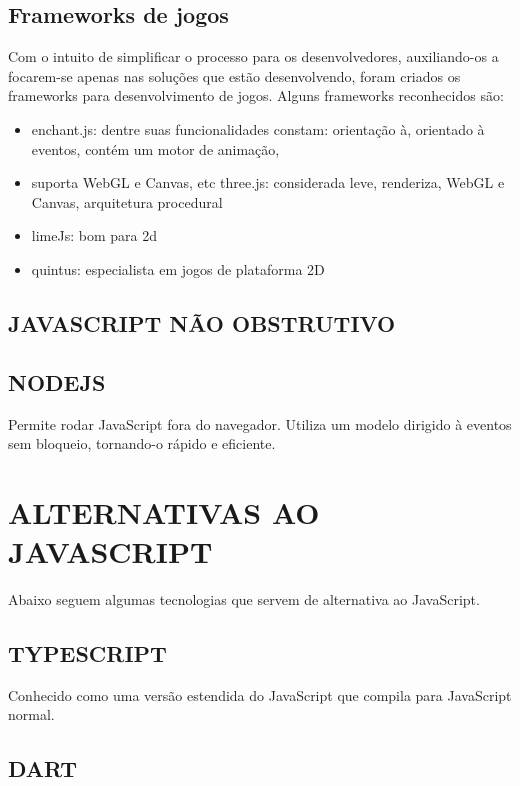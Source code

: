 \documentclass[
12pt,
a4paper,
portuges,
draft
]{report}
\begin{document}
\section{Frameworks de jogos}

Com o intuito de simplificar o processo para os desenvolvedores,
auxiliando-os a focarem-se apenas nas soluções que estão
desenvolvendo, foram criados os frameworks para desenvolvimento de
jogos. Alguns frameworks reconhecidos são:

\begin{itemize}
\item enchant.js: dentre suas funcionalidades constam: orientação à, orientado à eventos, contém um motor de animação,
\item suporta WebGL e Canvas, etc three.js: considerada leve, renderiza, WebGL e Canvas, arquitetura procedural
\item limeJs: bom para 2d
\item quintus: especialista em jogos de plataforma 2D
\end{itemize}

\section{JAVASCRIPT NÃO OBSTRUTIVO}

\section{NODEJS}

Permite rodar JavaScript fora do navegador. Utiliza um modelo dirigido
à eventos sem bloqueio, tornando-o rápido e eficiente.

\chapter{ALTERNATIVAS AO JAVASCRIPT}

Abaixo seguem algumas tecnologias que servem de alternativa ao
JavaScript.

\section{TYPESCRIPT}

Conhecido como uma versão estendida do JavaScript que compila para
JavaScript normal.

\section{DART}
\end{document}
